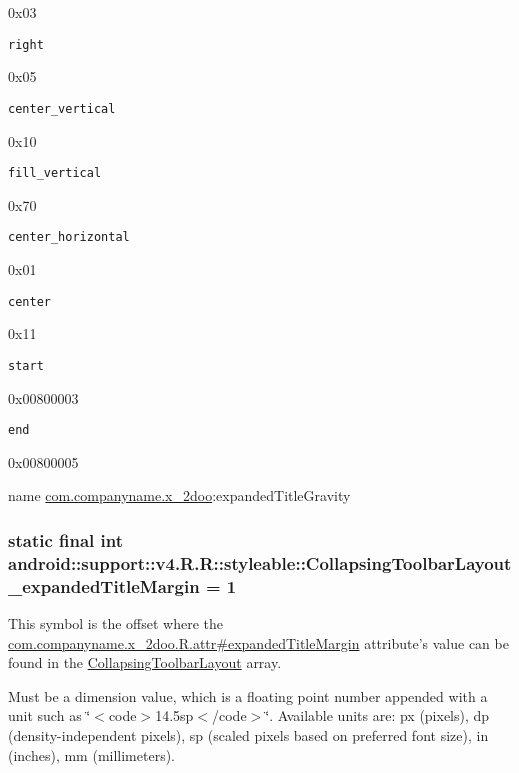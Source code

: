 0x03

{\tt right}

0x05

{\tt center\_\-vertical}

0x10

{\tt fill\_\-vertical}

0x70

{\tt center\_\-horizontal}

0x01

{\tt center}

0x11

{\tt start}

0x00800003

{\tt end}

0x00800005

name \hyperlink{namespacecom_1_1companyname_1_1x__2doo}{com.companyname.x\_\-2doo}:expandedTitleGravity \hypertarget{classandroid_1_1support_1_1v4_1_1_r_1_1styleable_d2288d088bf1c64e433d0cbecf59b50e}{
\subsubsection[{CollapsingToolbarLayout\_\-expandedTitleMargin}]{\setlength{\rightskip}{0pt plus 5cm}static final int android::support::v4.R.R::styleable::CollapsingToolbarLayout\_\-expandedTitleMargin = 1}}
\label{classandroid_1_1support_1_1v4_1_1_r_1_1styleable_d2288d088bf1c64e433d0cbecf59b50e}


This symbol is the offset where the \hyperlink{classcom_1_1companyname_1_1x__2doo_1_1_r_1_1attr_f8591111e92d0636a1acdd1a8ad52c26}{com.companyname.x\_\-2doo.R.attr\#expandedTitleMargin} attribute's value can be found in the \hyperlink{classandroid_1_1support_1_1v4_1_1_r_1_1styleable_aa101903fcf4b45a3b7fee0a0abc5ea8}{CollapsingToolbarLayout} array.

Must be a dimension value, which is a floating point number appended with a unit such as \char`\"{}$<$code$>$14.5sp$<$/code$>$\char`\"{}. Available units are: px (pixels), dp (density-independent pixels), sp (scaled pixels based on preferred font size), in (inches), mm (millimeters). 

